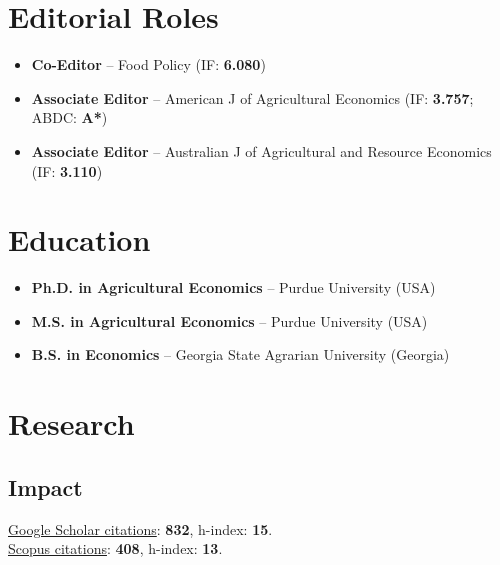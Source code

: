 \documentclass[10pt]{article}
\begin{document}
	\section*{Editorial Roles}
	\begin{itemize}
		\item {} \textbf{Co-Editor} -- Food Policy (IF: \textbf{6.080})
		\item {} \textbf{Associate Editor} -- American J of Agricultural Economics (IF: \textbf{3.757}; ABDC: \textbf{A*})
		\item {} \textbf{Associate Editor} -- Australian J of Agricultural and Resource Economics (IF: \textbf{3.110})
	\end{itemize}
	
	\section*{Education}
	\begin{itemize}
		\item {} \textbf{Ph.D. in Agricultural Economics} -- Purdue University (USA)
		\item {} \textbf{M.S. in Agricultural Economics} -- Purdue University (USA)
		\item {} \textbf{B.S. in Economics} -- Georgia State Agrarian University (Georgia)
	\end{itemize}
	
	\section*{Research}
	
	\subsection*{Impact}
	\href{https://scholar.google.com/citations?user=VbNOr6wAAAAJ&hl=en}{Google Scholar citations}: \textbf{832}, h-index: \textbf{15}.\\	
	\href{https://www.scopus.com/authid/detail.uri?authorId=26421832000}{Scopus citations}: \textbf{408}, h-index: \textbf{13}.	
	
	\begin{refsection}[papers]
		\nocite{ubilava2022ajae,ferguson2022,ubilava2022agec,hastings2022,angus2021,atalay2021,ubilava2019el,ubilava2019erl,ubilava2019md,ubilava2018ajae,smith2017gec,ubilava2017wd,tack2015agec,ubilava2014erae,tack2013cc,ubilava2013ems,ubilava2013ajare,ubilava2012agec,ubilava2012agri,ubilava2011jare,ubilava2011jcb,ubilava2010tfsc,ubilava2009fp}
		\printbibliography[heading={articles}]
	\end{refsection}
	\begin{refsection}[papers]
		\nocite{rice_enso,conflict_seasia}
		\printbibliography[heading={papers}]
	\end{refsection}
	
\end{document}
